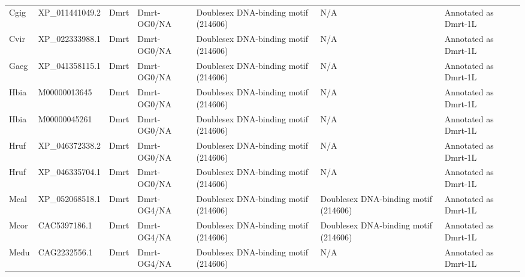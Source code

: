 \documentclass[../main.tex]{subfiles}
\begin{document}
\begin{landscape}
\begin{longtable}{lllllll}
		Cgig           & XP\_011441049.2       & Dmrt           & Dmrt-OG0/NA         & Doublesex DNA-binding motif (214606)        & N/A                                                                    & Annotated as Dmrt-1L \\
		Cvir           & XP\_022333988.1       & Dmrt           & Dmrt-OG0/NA         & Doublesex DNA-binding motif (214606)        & N/A                                                                    & Annotated as Dmrt-1L \\
		Gaeg           & XP\_041358115.1       & Dmrt           & Dmrt-OG0/NA         & Doublesex DNA-binding motif (214606)        & N/A                                                                    & Annotated as Dmrt-1L \\
		Hbia           & M00000013645          & Dmrt           & Dmrt-OG0/NA         & Doublesex DNA-binding motif (214606)        & N/A                                                                    & Annotated as Dmrt-1L \\
		Hbia           & M00000045261          & Dmrt           & Dmrt-OG0/NA         & Doublesex DNA-binding motif (214606)        & N/A                                                                    & Annotated as Dmrt-1L \\
		Hruf           & XP\_046372338.2       & Dmrt           & Dmrt-OG0/NA         & Doublesex DNA-binding motif (214606)        & N/A                                                                    & Annotated as Dmrt-1L \\
		Hruf           & XP\_046335704.1       & Dmrt           & Dmrt-OG0/NA         & Doublesex DNA-binding motif (214606)        & N/A                                                                    & Annotated as Dmrt-1L \\
		Mcal           & XP\_052068518.1       & Dmrt           & Dmrt-OG4/NA         & Doublesex DNA-binding motif (214606)        & Doublesex DNA-binding motif (214606)                                   & Annotated as Dmrt-1L \\
		Mcor           & CAC5397186.1          & Dmrt           & Dmrt-OG4/NA         & Doublesex DNA-binding motif (214606)        & Doublesex DNA-binding motif (214606)                                   & Annotated as Dmrt-1L \\
		Medu           & CAG2232556.1          & Dmrt           & Dmrt-OG4/NA         & Doublesex DNA-binding motif (214606)        & N/A                                                                    & Annotated as Dmrt-1L \\

\end{longtable}
\end{landscape}
\end{document}
